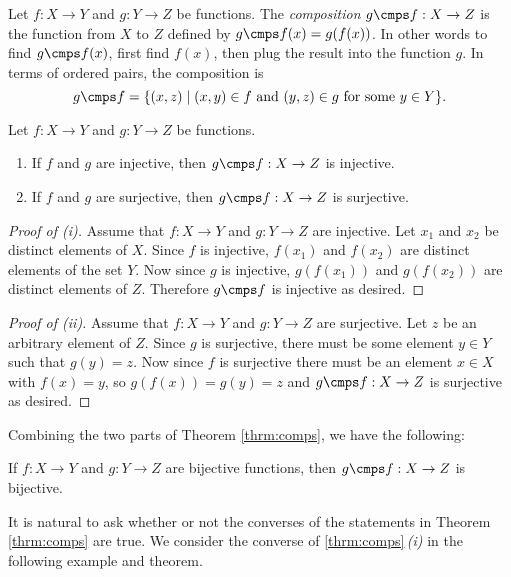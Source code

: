 \begin{definition}
Let $f:X\to Y$ and $g:Y\to Z$ be functions.  The \emph{composition} $g\cmps f:X\to Z$ is the function from $X$ to $Z$ defined by $g\cmps f(x)=g(f(x))$.  In other words to find $g\cmps f(x)$, first find $f(x)$, then plug the result into the function $g$.  In terms of ordered pairs, the composition is \[g\cmps f=\{(x,z)\mid (x,y)\in f \mbox{ and } (y,z)\in g \mbox{ for some } y\in Y\}.\] 
\end{definition}

\begin{thrm}\label{thrm:comps}
Let $f:X\to Y$ and $g:Y\to Z$ be functions.
\begin{enumerate}
\item If $f$ and $g$ are injective, then $g\cmps f:X\to Z$ is injective.
\item If $f$ and $g$ are surjective, then $g\cmps f:X\to Z$ is surjective. 
\end{enumerate}
\end{thrm}

\begin{proof}[Proof of (i)]
Assume that $f:X\to Y$ and $g:Y\to Z$ are injective.  Let $x_1$ and $x_2$ be distinct elements of $X$.  Since $f$ is injective, $f(x_1)$ and $f(x_2)$ are distinct elements of the set $Y$.  Now since $g$ is injective, $g(f(x_1))$ and $g(f(x_2))$ are distinct elements of $Z$. Therefore $g\cmps f$ is injective as desired.
\end{proof}

\begin{proof}[Proof of (ii)]
Assume that $f:X\to Y$ and $g:Y\to Z$ are surjective.  Let $z$ be an arbitrary element of $Z$.  Since $g$ is surjective, there must be some element $y\in Y$ such that $g(y)=z$.  Now since $f$ is surjective there must be an element $x\in X$ with $f(x)=y$, so $g(f(x))=g(y)=z$ and $g\cmps f:X\to Z$ is surjective as desired.
\end{proof}

Combining the two parts of Theorem \ref{thrm:comps}, we have the following:

\begin{coro}\label{coro:compbij}
If $f:X\to Y$ and $g:Y\to Z$ are bijective functions, then $g\cmps f:X \to Z$ is bijective.
\end{coro}

It is natural to ask whether or not the converses of the statements in Theorem \ref{thrm:comps} are true.  We consider the converse of \ref{thrm:comps}\,\emph{(i)} in the following example and theorem.

